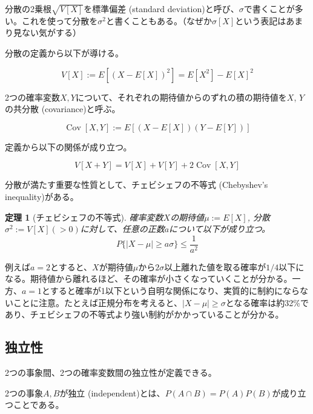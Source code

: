 \documentclass[uplatex,dvipdfmx]{jlreq}
\newcommand\term[1]{\textsf{#1}}
\newtheorem{theorem}{定理}
\begin{document}
分散の2乗根$\sqrt{V[X]}$を\term{標準偏差 (standard deviation)}と呼び、$\sigma$で書くことが多い。これを使って分散を$\sigma^2$と書くこともある。（なぜか$\sigma[X]$という表記はあまり見ない気がする）

分散の定義から以下が導ける。

\begin{equation}
    V[X] := E[(X-E[X])^2] = E[X^2] - E[X]^2
\end{equation}

2つの確率変数$X, Y$について、それぞれの期待値からのずれの積の期待値を$X$, $Y$の\term{共分散 (covariance)}と呼ぶ。

\begin{equation}
    \operatorname{Cov}[X, Y] :=
    E[(X-E[X])(Y-E[Y])]
\end{equation}

定義から以下の関係が成り立つ。

\begin{equation}
    V[X + Y] = V[X] + V[Y] + 2\operatorname{Cov}[X, Y]
\end{equation}

分散が満たす重要な性質として、\term{チェビシェフの不等式 (Chebyshev's inequality)}がある。

\begin{theorem}[チェビシェフの不等式]
    確率変数$X$の期待値$\mu:=E[X]$, 分散$\sigma^2:=V[X] (>0)$に対して、任意の正数$a$について以下が成り立つ。
    \begin{equation}
        P\{|X - \mu| \geq a\sigma\} \leq \frac{1}{a^2}
    \end{equation}
\end{theorem}

例えば$a=2$とすると、$X$が期待値$\mu$から$2\sigma$以上離れた値を取る確率が$1/4$以下になる。期待値から離れるほど、その確率が小さくなっていくことが分かる。一方、$a=1$とすると確率が1以下という自明な関係になり、実質的に制約にならないことに注意。たとえば正規分布を考えると、$|X-\mu|\geq\sigma$となる確率は約32\%であり、チェビシェフの不等式より強い制約がかかっていることが分かる。

\subsection{独立性}

2つの事象間、2つの確率変数間の独立性が定義できる。

2つの事象$A, B$が\term{独立 (independent)}とは、$P(A \cap B) = P(A)P(B)$が成り立つことである。
\end{document}
